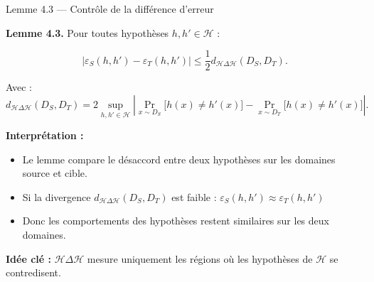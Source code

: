 \documentclass[11pt]{beamer}
\begin{document}
\begin{frame}{Lemme 4.3 — Contrôle de la différence d’erreur}

\textbf{Lemme 4.3.} Pour toutes hypothèses $h,h' \in \mathcal H$ :

\[
\left|
\varepsilon_S(h,h')
-
\varepsilon_T(h,h')
\right|
\le
\frac12 d_{\mathcal H \Delta \mathcal H}(D_S,D_T).
\]

\vspace{0.2cm}

Avec : 
\[
d_{\mathcal{H}\Delta\mathcal{H}}(D_S, D_T)
= 2 \sup_{h, h' \in \mathcal{H}}
\left| \Pr_{x \sim D_S}\bigl[h(x) \neq h'(x)\bigr]
- \Pr_{x \sim D_T}\bigl[h(x) \neq h'(x)\bigr] \right|.
\]

\vspace{0.2cm}

\textbf{Interprétation :}

\begin{itemize}
    \item Le lemme compare le désaccord entre deux hypothèses
    sur les domaines source et cible.
    
    \item Si la divergence 
    $d_{\mathcal H \Delta \mathcal H}(D_S,D_T)$
    est faible : $
    \varepsilon_S(h,h')
    \approx
    \varepsilon_T(h,h')$
    
    \item Donc les comportements des hypothèses restent similaires
    sur les deux domaines.
\end{itemize}

\vspace{0.3cm}

\textbf{Idée clé :}
$\mathcal H \Delta \mathcal H$
mesure uniquement les régions où les hypothèses de $\mathcal H$
se contredisent.

\end{frame}
\end{document}
